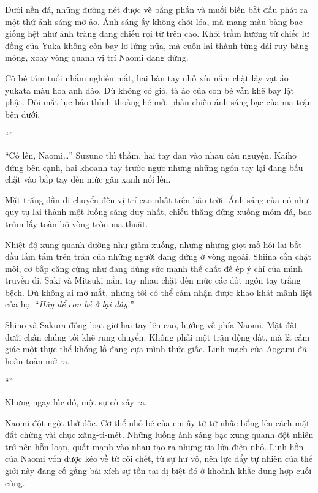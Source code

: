 \documentclass[../main.tex]{subfiles}
\begin{document}
Dưới nền đá, những đường nét được vẽ bằng phấn và muối biển bắt đầu phát ra một thứ ánh sáng mờ ảo. Ánh sáng ấy không chói lóa, mà mang màu bàng bạc giống hệt như ánh trăng đang chiếu rọi từ trên cao. Khói trầm hương từ chiếc lư đồng của Yuka không còn bay lơ lửng nữa, mà cuộn lại thành từng dải ruy băng mỏng, xoay vòng quanh vị trí Naomi đang đứng.

Cô bé tám tuổi nhắm nghiền mắt, hai bàn tay nhỏ xíu nắm chặt lấy vạt áo yukata màu hoa anh đào. Dù không có gió, tà áo của con bé vẫn khẽ bay lật phật. Đôi mắt lục bảo thỉnh thoảng hé mở, phản chiếu ánh sáng bạc của ma trận bên dưới.

``''

``Cố lên, Naomi\dots'' Suzuno thì thầm, hai tay đan vào nhau cầu nguyện. Kaiho đứng bên cạnh, hai khoanh tay trước ngực nhưng những ngón tay lại đang bấu chặt vào bắp tay đến mức gân xanh nổi lên.

Mặt trăng dần di chuyển đến vị trí cao nhất trên bầu trời. Ánh sáng của nó như quy tụ lại thành một luồng sáng duy nhất, chiếu thẳng đứng xuống mỏm đá, bao trùm lấy toàn bộ vòng tròn ma thuật.

Nhiệt độ xung quanh dường như giảm xuống, nhưng những giọt mồ hôi lại bắt đầu lấm tấm trên trán của những người đang đứng ở vòng ngoài. Shiina cắn chặt môi, cơ bắp căng cứng như đang dùng sức mạnh thể chất để ép ý chí của mình truyền đi. Saki và Mitsuki nắm tay nhau chặt đến mức các đốt ngón tay trắng bệch. Dù không ai mở mắt, nhưng tôi có thể cảm nhận được khao khát mãnh liệt của họ: ``\emph{Hãy để con bé ở lại đây.}''

Shino và Sakura đồng loạt giơ hai tay lên cao, hướng về phía Naomi. Mặt đất dưới chân chúng tôi khẽ rung chuyển. Không phải một trận động đất, mà là cảm giác một thực thể khổng lồ đang cựa mình thức giấc. Linh mạch của Aogami đã hoàn toàn mở ra.

``''

Nhưng ngay lúc đó, một sự cố xảy ra.

Naomi đột ngột thở dốc. Cơ thể nhỏ bé của em ấy từ từ nhấc bổng lên cách mặt đất chừng vài chục xăng-ti-mét. Những luồng ánh sáng bạc xung quanh đột nhiên trở nên hỗn loạn, quất mạnh vào nhau tạo ra những tia lửa điện nhỏ. Linh hồn của Naomi vốn được kéo về từ cõi chết, từ sự hư vô, nên lực đẩy tự nhiên của thế giới này đang cố gắng bài xích sự tồn tại dị biệt đó ở khoảnh khắc dung hợp cuối cùng.
\end{document}
